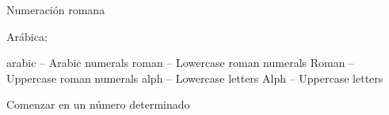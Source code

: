 \maketitle
\thispagestyle{empty}


Numeración romana
\renewcommand{\thepage}{\roman{page}}

Arábica:
\renewcommand{\thepage}{\arabic{page}}

arabic – Arabic numerals
roman – Lowercase roman numerals
Roman – Uppercase roman numerals
alph – Lowercase letters
Alph – Uppercase letters

Comenzar en un número determinado
\setcounter{page}{1}

